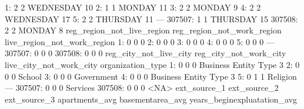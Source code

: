 \documentclass[a4paper]{article}
\begin{document}
\begin{Schunk}
\begin{Soutput}
     1:                    2                           2                  WEDNESDAY                      10
     2:                    1                           1                     MONDAY                      11
     3:                    2                           2                     MONDAY                       9
     4:                    2                           2                  WEDNESDAY                      17
     5:                    2                           2                   THURSDAY                      11
    ---                                                                                                    
307507:                    1                           1                   THURSDAY                      15
307508:                    2                           2                     MONDAY                       8
        reg_region_not_live_region reg_region_not_work_region live_region_not_work_region
     1:                          0                          0                           0
     2:                          0                          0                           0
     3:                          0                          0                           0
     4:                          0                          0                           0
     5:                          0                          0                           0
    ---                                                                                  
307507:                          0                          0                           0
307508:                          0                          0                           0
        reg_city_not_live_city reg_city_not_work_city live_city_not_work_city      organization_type
     1:                      0                      0                       0 Business Entity Type 3
     2:                      0                      0                       0                 School
     3:                      0                      0                       0             Government
     4:                      0                      0                       0 Business Entity Type 3
     5:                      0                      1                       1               Religion
    ---                                                                                             
307507:                      0                      0                       0               Services
307508:                      0                      0                       0                   <NA>
        ext_source_1 ext_source_2 ext_source_3 apartments_avg basementarea_avg years_beginexpluatation_avg

\end{Soutput}
\end{Schunk}
\end{document}
